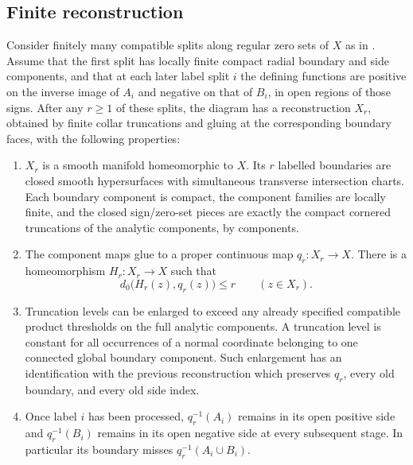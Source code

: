 \subsection{Finite reconstruction}

\begin{proposition}\label{component:reconstruction}
Consider finitely many compatible splits along regular zero sets of $X$ as in
. Assume that the first split has locally finite
compact radial boundary and side components, and that at each later label
split $i$ the defining functions are positive on the inverse image of
$A_i$ and negative on that of $B_i$, in open regions of those signs.
After any $r\ge1$ of these splits, the diagram has a reconstruction
$X_r$, obtained by finite collar truncations and gluing at the corresponding boundary faces,
with the following properties:
\begin{enumerate}[label=(\roman*),leftmargin=*]
\item $X_r$ is a smooth manifold homeomorphic to $X$.  Its $r$ labelled
boundaries are closed smooth hypersurfaces with simultaneous transverse
intersection charts.  Each boundary component is compact, the component
families are locally finite, and the closed sign/zero-set pieces are exactly
the compact cornered truncations of the analytic components, by components.
\item The component maps glue to a proper continuous map $q_r:X_r\to X$.
There is a homeomorphism $H_r:X_r\to X$ such that
\begin{equation}\label{component:displacement}
 d_0\bigl(H_r(z),q_r(z)\bigr)\le r\qquad(z\in X_r).
\end{equation}
\item Truncation levels can be enlarged to exceed any already specified
compatible product thresholds on the full analytic components.  A truncation level
is constant for all occurrences of a normal coordinate belonging to
one connected global boundary component.  Such enlargement has an
identification with the previous reconstruction which preserves
$q_r$, every old boundary, and every old side index.
\item Once label $i$ has been processed, $q_r^{-1}(A_i)$ remains in its
open positive side and $q_r^{-1}(B_i)$ remains in its open negative
side at every subsequent stage.  In particular its boundary misses
$q_r^{-1}(A_i\cup B_i)$.
\end{enumerate}
\end{proposition}


